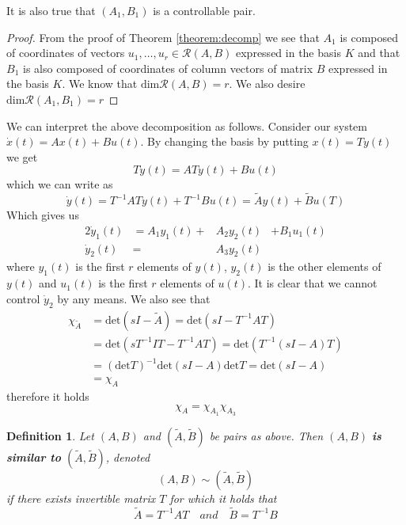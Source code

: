 \documentclass[12pt,a4paper]{report}
\newtheorem*{definition}{Definition}
\begin{document}
It is also true that $(A_1,B_1)$ is a controllable pair.

\begin{proof}
	From the proof of Theorem \ref{theorem:decomp} we see that $A_1$ is composed of coordinates of vectors $u_1,\ldots,u_r \in \mathcal{R}(A,B)$ expressed in the basis $K$ and that $B_1$ is also composed of coordinates of column vectors of matrix $B$ expressed in the basis $K$. We know that $\text{dim}\mathcal{R}(A,B)=r$. We also desire $\text{dim}\mathcal{R}(A_1,B_1)=r$
\end{proof}

We can interpret the above decomposition as follows. Consider our system $\dot{x}(t)=Ax(t)+Bu(t)$. By changing the basis by putting $x(t)=Ty(t)$ we get $$T\dot{y}(t)=ATy(t)+Bu(t)$$ which we can write as $$\dot{y}(t)=T^{-1}ATy(t)+T^{-1}Bu(t)=\widetilde{A}y(t)+\widetilde{B}u(T)$$ Which gives us 
\begin{alignat*}{2}
	\dot{y}_1(t)&=A_1y_1(t)+&A_2y_2(t)&+B_1u_1(t) \\
	\dot{y}_2(t)&=&A_3y_2(t)&
\end{alignat*}
where $y_1(t)$ is the first $r$ elements of $y(t)$, $y_2(t)$ is the other elements of $y(t)$ and $u_1(t)$ is the first $r$ elements of $u(t)$. It is clear that we cannot control $\dot{y}_2$ by any means. We also see that 
\begin{align*}
	\chi_{\widetilde{A}}&=\text{det}(sI-\widetilde{A})=\text{det}(sI-T^{-1}AT) \\
	&=\text{det}(sT^{-1}IT-T^{-1}AT)=\text{det}(T^{-1}(sI-A)T) \\
	&=(\text{det}T)^{-1}\text{det}(sI-A)\text{det}T=\text{det}(sI-A) \\
	&=\chi_A
\end{align*}
therefore it holds $$\chi_A=\chi_{A_1}\chi_{A_3}$$ 

\begin{definition}
	Let $(A,B)$ and $(\widetilde{A},\widetilde{B})$ be pairs as above. Then $(A,B)$ \textnormal{\textbf{is similar to}} $(\widetilde{A},\widetilde{B})$, denoted $$(A,B) \sim (\widetilde{A},\widetilde{B})$$ if there exists invertible matrix $T$ for which it holds that $$\widetilde{A}=T^{-1}AT\quad and\quad\widetilde{B}=T^{-1}B$$
\end{definition}
\end{document}
